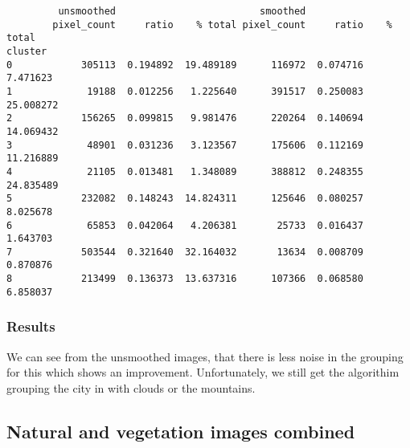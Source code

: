 \documentclass[11pt]{article}
\begin{document}
    
    \begin{verbatim}
         unsmoothed                         smoothed                     
        pixel_count     ratio    % total pixel_count     ratio    % total
cluster                                                                  
0            305113  0.194892  19.489189      116972  0.074716   7.471623
1             19188  0.012256   1.225640      391517  0.250083  25.008272
2            156265  0.099815   9.981476      220264  0.140694  14.069432
3             48901  0.031236   3.123567      175606  0.112169  11.216889
4             21105  0.013481   1.348089      388812  0.248355  24.835489
5            232082  0.148243  14.824311      125646  0.080257   8.025678
6             65853  0.042064   4.206381       25733  0.016437   1.643703
7            503544  0.321640  32.164032       13634  0.008709   0.870876
8            213499  0.136373  13.637316      107366  0.068580   6.858037
    \end{verbatim}

    
    \subsubsection{Results}\label{results}

We can see from the unsmoothed images, that there is less noise in the
grouping for this which shows an improvement. Unfortunately, we still
get the algorithim grouping the city in with clouds or the mountains.

    \subsection{Natural and vegetation images
combined}\label{natural-and-vegetation-images-combined}
\end{document}
